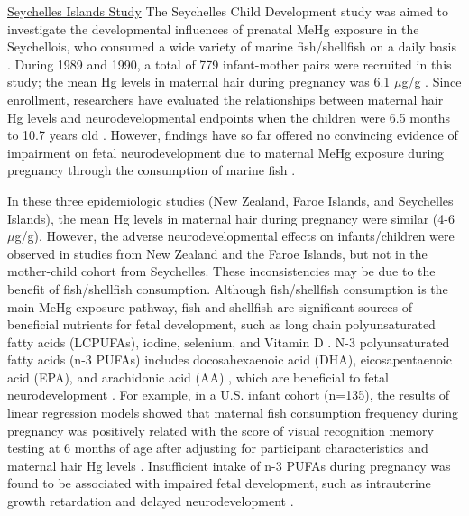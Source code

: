 \underline{Seychelles Islands Study} The Seychelles Child Development study was aimed to investigate the developmental influences of prenatal MeHg exposure in the Seychellois, who consumed a wide variety of marine fish/shellfish on a daily basis \citep{davidson2006prenatal}. During 1989 and 1990, a total of 779 infant-mother pairs were recruited in this study; the mean Hg levels in maternal hair during pregnancy was 6.1 \({\mu}\)g/g \citep{marsh1994seychelles}. Since enrollment, researchers have evaluated the relationships between maternal hair Hg levels and neurodevelopmental endpoints when the children were 6.5 months to 10.7 years old \citep{davidson1998effects,davidson2006prenatal,davidson2008association,myers2003prenatal}. However, findings have so far offered no convincing evidence of impairment on fetal neurodevelopment due to maternal MeHg exposure during pregnancy through the consumption of marine fish \citep{davidson2006prenatal,davidson2008association}. 

In these three epidemiologic studies (New Zealand, Faroe Islands, and Seychelles Islands), the mean Hg levels in maternal hair during pregnancy were similar (4-6 \({\mu}\)g/g). However, the adverse neurodevelopmental effects on infants/children were observed in studies from New Zealand and the Faroe Islands, but not in the mother-child cohort from Seychelles. These inconsistencies may be due to the benefit of fish/shellfish consumption. Although fish/shellfish consumption is the main MeHg exposure pathway, fish and shellfish are significant sources of beneficial nutrients for fetal development, such as long chain polyunsaturated fatty acids (LCPUFAs), iodine, selenium, and Vitamin D \citep{national2000toxicological}. N-3 polyunsaturated fatty acids (n-3 PUFAs) includes docosahexaenoic acid (DHA), eicosapentaenoic acid (EPA), and arachidonic acid (AA) \citep{siriwardhana2012health}, which are beneficial to fetal neurodevelopment \citep{birch2007visual}. For example, in a U.S. infant cohort (n=135), the results of linear regression models showed that maternal fish consumption frequency during pregnancy was positively related with the score of visual recognition memory testing at 6 months of age after adjusting for participant characteristics and maternal hair Hg levels \citep{oken2005maternal}. Insufficient intake of n-3 PUFAs during pregnancy was found to be associated with impaired fetal development, such as intrauterine growth retardation and delayed neurodevelopment \citep{hibbeln2007maternal}.

